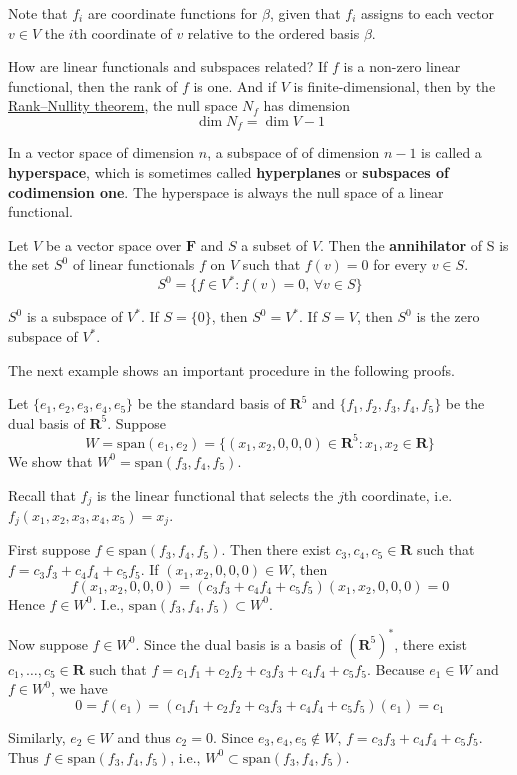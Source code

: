 Note that $f_i$ are coordinate functions for $\beta$, given that $f_i$ assigns to each vector $v \in V$ the $i$th coordinate of $v$ relative to the ordered basis $\beta$.

How are linear functionals and subspaces related? If $f$ is a non-zero linear functional, then the rank of $f$ is one. And if $V$ is finite-dimensional, then by the \hyperref[thm:rank-null]{Rank–Nullity theorem}, the null space $N_f$ has dimension
\[
	\dim N_f = \dim V - 1
\]

In a vector space of dimension $n$, a subspace of of dimension $n-1$ is called a \textbf{hyperspace}, which is sometimes called \textbf{hyperplanes} or \textbf{subspaces of codimension one}. The hyperspace is always the null space of a linear functional.

\begin{definition}[Annihilator]
	Let $V$ be a vector space over $\textbf{F}$ and $S$ a subset of $V$. Then the \textbf{annihilator} of S is the set $S^0$ of linear functionals $f$ on $V$ such that $f(v) = 0$ for every $v \in S$.
	\[
		S^0 = \{ f \in V^\ast : f(v) = 0, \, \forall v \in S \}
	\]
\end{definition}

$S^0$ is a subspace of $V^\ast$. If $S = \{ 0 \}$, then $S^0 = V^\ast$. If $S = V$, then $S^0$ is the zero subspace of $V^\ast$.

The next example shows an important procedure in the following proofs.

\begin{example}
	Let $\{ e_1, e_2, e_3, e_4, e_5 \}$ be the standard basis of $\textbf{R}^5$ and $\{ f_1, f_2, f_3, f_4, f_5 \}$ be the dual basis of $\textbf{R}^5$. Suppose
	\[
		W = \text{span}(e_1, e_2) = \{ (x_1, x_2, 0, 0, 0)  \in \textbf{R}^5 : x_1, x_2 \in \textbf{R} \}
	\]
	We show that $W^0 = \text{span}(f_3, f_4, f_5)$.

	Recall that $f_j$ is the linear functional that selects the $j$th coordinate, i.e. $f_j(x_1, x_2, x_3, x_4, x_5) = x_j$.

	First suppose $f \in \text{span}(f_3, f_4, f_5)$. Then there exist $c_3, c_4, c_5 \in \textbf{R}$ such that $f = c_3 f_3 + c_4 f_4 + c_5 f_5$. If $(x_1, x_2, 0, 0, 0) \in W$, then 
	\[
		f(x_1, x_2, 0, 0, 0) = (c_3 f_3 + c_4 f_4 + c_5 f_5)(x_1, x_2, 0, 0, 0) = 0
	\]
	Hence $f \in W^0$. I.e., $\text{span}(f_3, f_4, f_5) \subset W^0$.

	Now suppose $f \in W^0$. Since the dual basis is a basis of $(\textbf{R}^5)^\ast$, there exist $c_1, \ldots, c_5 \in \textbf{R}$ such that $f = c_1 f_1 + c_2 f_2 + c_3 f_3 + c_4 f_4 + c_5 f_5$. Because $e_1 \in W$ and $f \in W^0$, we have
	\[
		0 = f(e_1) = (c_1 f_1 + c_2 f_2 + c_3 f_3 + c_4 f_4 + c_5 f_5)(e_1) = c_1
	\]

	Similarly, $e_2 \in W$ and thus $c_2 = 0$. Since $e_3, e_4, e_5 \notin W$, $f = c_3 f_3 + c_4 f_4 + c_5 f_5$. Thus $f \in \text{span}(f_3, f_4, f_5)$, i.e., $W^0 \subset \text{span}(f_3, f_4, f_5)$.
\end{example}

